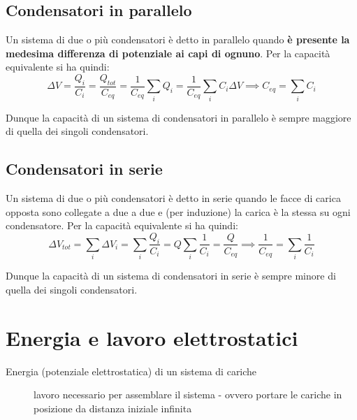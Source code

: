 \subsection{Condensatori in parallelo}
Un sistema di due o più condensatori è detto in parallelo quando \textbf{è presente la medesima differenza di potenziale ai capi di ognuno}. Per la capacità equivalente si ha quindi:
\[\Delta V = \frac{Q_i}{C_i} = \frac{Q_{tot}}{C_{eq}} = \frac{1}{C_{eq}} \sum_i Q_i = \frac{1}{C_{eq}} \sum_i C_i \Delta V \implies C_{eq} = \sum_i C_i\]


Dunque la capacità di un sistema di condensatori in parallelo è sempre maggiore di quella dei singoli condensatori.

\subsection{Condensatori in serie}
Un sistema di due o più condensatori è detto in serie quando le facce di carica opposta sono collegate a due a due e (per induzione) la carica è la stessa su ogni condensatore. Per la capacità equivalente si ha quindi:
\[\Delta V_{tot} = \sum_i \Delta V_i = \sum_i \frac{Q_i}{C_i} = Q \sum_i \frac{1}{C_i} = \frac{Q}{C_{eq}} \implies \frac{1}{C_{eq}} = \sum_i \frac{1}{C_i}\]


Dunque la capacità di un sistema di condensatori in serie è sempre minore di quella dei singoli condensatori.

\section{Energia e lavoro elettrostatici}
\begin{description}
\item[Energia (potenziale elettrostatica) di un sistema di cariche] lavoro necessario per assemblare il sistema - ovvero portare le cariche in posizione da distanza iniziale infinita
\end{description}

